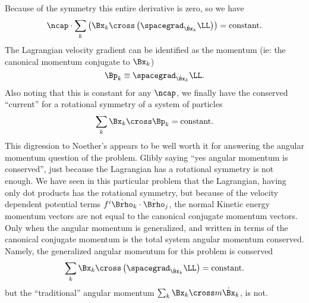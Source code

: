 {\begin{equation}
\end{equation}
%
Because of the symmetry this entire derivative is zero, so we have
%
\begin{equation}\label{eqn:goldsteinCh12:560}
\ncap \cdot \sum_{k} \left(\Bx_k \cross \left( \spacegrad_{\dot{\Bx}_k} \LL \right) \right) = \text{constant}.
\end{equation}
%
The Lagrangian velocity gradient can be identified as the momentum
(ie: the canonical momentum conjugate to \(\Bx_k\))
%
\begin{equation}\label{eqn:goldsteinCh12:580}
\Bp_k \equiv \spacegrad_{\dot{\Bx}_k} \LL.
\end{equation}
%
Also noting that this is constant for any \(\ncap\), we finally have the
conserved ``current'' for a rotational symmetry of a system of particles
%
\begin{equation}\label{eqn:goldsteinCh12:600}
\sum_{k} \Bx_k \cross \Bp_k = \text{constant}.
\end{equation}
%
This digression to Noether's appears to be well worth it for answering the angular momentum question of the problem.  Glibly saying ``yes
angular momentum is conserved'', just because the Lagrangian has a rotational symmetry is not enough.  We have seen in this particular
problem that the Lagrangian, having only dot products has the rotational symmetry, but because of the velocity dependent
potential terms \(f^i \dot{\Brho}_k \cdot \dot{\Brho}_j\), the normal Kinetic energy momentum vectors are not equal to the canonical conjugate
momentum vectors.  Only when the angular momentum is generalized, and written in terms of the canonical conjugate momentum is the total
system angular momentum conserved.  Namely, the generalized angular momentum for this problem is conserved
%
\begin{equation}\label{eqn:goldsteinCh12:620}
\sum_{k} \Bx_k \cross \left( \spacegrad_{\dot{\Bx}_k} \LL \right) = \text{constant}.
\end{equation}
%
but the ``traditional'' angular momentum \(\sum_k \Bx_k \cross m \dot{\Bx}_k\), is not.
}
%
